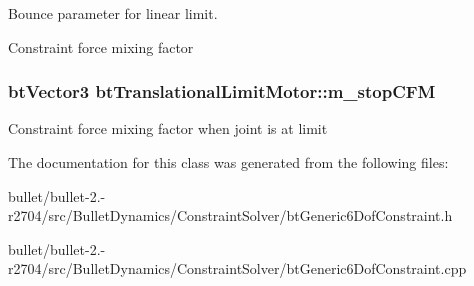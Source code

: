 Bounce parameter for linear limit. 

Constraint force mixing factor \hypertarget{classbt_translational_limit_motor_a531c6ae0a0805eaa4fc59a40982a67f8}{
\subsubsection[{m\+\_\+stop\+C\+F\+M}]{\setlength{\rightskip}{0pt plus 5cm}bt\+Vector3 bt\+Translational\+Limit\+Motor\+::m\+\_\+stop\+C\+F\+M}}\label{classbt_translational_limit_motor_a531c6ae0a0805eaa4fc59a40982a67f8}
Constraint force mixing factor when joint is at limit 

The documentation for this class was generated from the following files\+:\begin{DoxyCompactItemize}
\item 
bullet/bullet-\/2.-\/r2704/src/\+Bullet\+Dynamics/\+Constraint\+Solver/bt\+Generic6\+Dof\+Constraint.\+h\item 
bullet/bullet-\/2.-\/r2704/src/\+Bullet\+Dynamics/\+Constraint\+Solver/bt\+Generic6\+Dof\+Constraint.\+cpp\end{DoxyCompactItemize}
